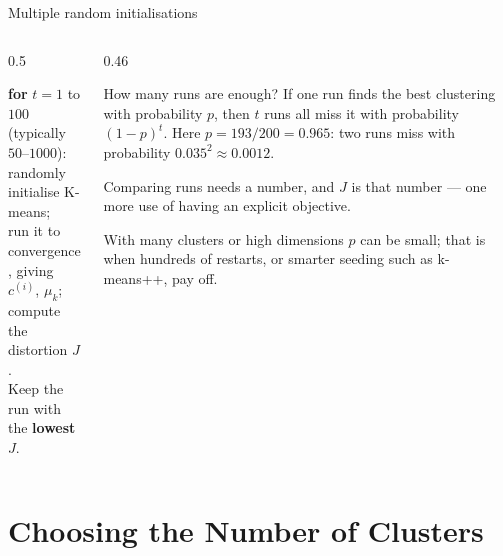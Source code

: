 \documentclass[aspectratio=169,10pt]{beamer}
\begin{document}
\begin{frame}{Multiple random initialisations}
  \begin{columns}[T,onlytextwidth]
    \begin{column}{0.5\textwidth}
      \begin{defnbox}[Recipe]
        \small
        \textbf{for} $t=1$ to $100$ (typically $50$--$1000$):\\
        \hspace*{1em}randomly initialise K-means;\\
        \hspace*{1em}run it to convergence, giving $c^{(i)}$, $\mu_k$;\\
        \hspace*{1em}compute the distortion $J$.\\
        Keep the run with the \textbf{lowest} $J$.
      \end{defnbox}
    \end{column}
    \begin{column}{0.46\textwidth}
      \footnotesize
      \begin{block}{How many runs are enough?}
        If one run finds the best clustering with probability $p$, then $t$ runs all miss it
        with probability $(1-p)^t$. Here $p=193/200=0.965$: two runs miss with probability
        $0.035^2\approx0.0012$.
      \end{block}
      \begin{keyidea}
        Comparing runs needs a number, and $J$ is that number --- one more use of having
        an explicit objective.
      \end{keyidea}
      \begin{pitfall}
        \footnotesize With many clusters or high dimensions $p$ can be small; that is when
        hundreds of restarts, or smarter seeding such as k-means++, pay off.
      \end{pitfall}
    \end{column}
  \end{columns}
\end{frame}

\section{Choosing the Number of Clusters}
\end{document}
